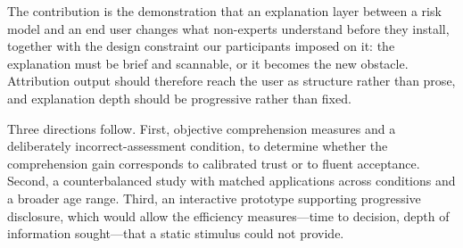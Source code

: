 \documentclass[sigconf]{acmart}
\begin{document}
The contribution is the demonstration that an explanation layer between a
risk model and an end user changes what non-experts understand before they
install, together with the design constraint our participants imposed on
it: the explanation must be brief and scannable, or it becomes the new
obstacle. Attribution output should therefore reach the user as structure
rather than prose, and explanation depth should be progressive rather than
fixed.

Three directions follow. First, objective comprehension measures and a
deliberately incorrect-assessment condition, to determine whether the
comprehension gain corresponds to calibrated trust or to fluent
acceptance. Second, a counterbalanced study with matched applications
across conditions and a broader age range. Third, an interactive prototype
supporting progressive disclosure, which would allow the efficiency
measures---time to decision, depth of information sought---that a static
stimulus could not provide.



\end{document}
